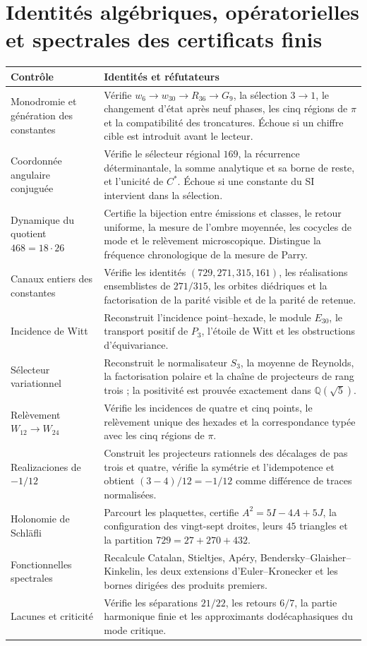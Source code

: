 \section{Identités algébriques, opératorielles et spectrales des certificats finis}

\begin{longtable}{@{}>{\raggedright\arraybackslash}p{}
  >{\raggedright\arraybackslash}p{}@{}}
\toprule
Contrôle & Identités et réfutateurs\\
\midrule
\endhead
Monodromie et génération des constantes
& Vérifie \(w_6\to w_{30}\to R_{36}\to G_9\), la sélection \(3\to1\),
le changement d'état après neuf phases, les cinq régions de \(\pi\) et la
compatibilité des troncatures. Échoue si un chiffre cible est introduit
avant le lecteur.\\
Coordonnée angulaire conjuguée
& Vérifie le sélecteur régional \(169\), la récurrence déterminantale, la
somme analytique et sa borne de reste, et l'unicité de \(C^*\). Échoue si une
constante du SI intervient dans la sélection.\\
Dynamique du quotient \(468=18\cdot26\)
& Certifie la bijection entre émissions et classes, le retour uniforme, la
mesure de l'ombre moyennée, les cocycles de mode et le relèvement
microscopique. Distingue la fréquence chronologique de la mesure de Parry.\\
Canaux entiers des constantes
& Vérifie les identités \((729,271,315,161)\), les réalisations
ensemblistes de \(271/315\), les orbites diédriques et la factorisation de la
parité visible et de la parité de retenue.\\
Incidence de Witt
& Reconstruit l'incidence point--hexade, le module \(E_{30}\), le
transport positif de \(P_3\), l'étoile de Witt et les obstructions
d'équivariance.\\
Sélecteur variationnel
& Reconstruit le normalisateur \(S_3\), la moyenne de Reynolds, la
factorisation polaire et la chaîne de projecteurs de rang trois ; la positivité
est prouvée exactement dans \(\mathbb Q(\sqrt5)\).\\
Relèvement \(W_{12}\to W_{24}\)
& Vérifie les incidences de quatre et cinq points, le relèvement unique des
hexades et la correspondance typée avec les cinq régions de \(\pi\).\\
Realizaciones de \(-1/12\)
& Construit les projecteurs rationnels des décalages de pas trois
et quatre, vérifie la symétrie et l'idempotence et obtient
\((3-4)/12=-1/12\) comme différence de traces normalisées.\\
Holonomie de Schläfli
& Parcourt les plaquettes, certifie \(A^2=5I-4A+5J\), la configuration des
vingt-sept droites, leurs \(45\) triangles et la partition
\(729=27+270+432\).\\
Fonctionnelles spectrales
& Recalcule Catalan, Stieltjes, Apéry, Bendersky--Glaisher--Kinkelin, les
deux extensions d'Euler--Kronecker et les bornes dirigées des produits premiers.\\
Lacunes et criticité
& Vérifie les séparations \(21/22\), les retours \(6/7\), la partie
harmonique finie et les approximants dodécaphasiques du mode critique.\\
\bottomrule
\end{longtable}

